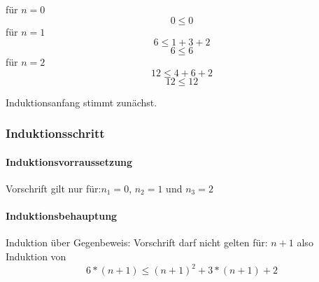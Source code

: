\documentclass{article}
\begin{document}
für $n=0$
\[0 \le 0\]
für $n=1$
\[6 \le 1+3+2\]
\[ 6 \le 6 \]
\newline
für $n=2$
\[12 \le 4+6+2\]
\[ 12 \le 12 \]
\newline

Induktionsanfang stimmt zunächst.
\subsubsection{Induktionsschritt}
\paragraph{Induktionsvorraussetzung}\mbox{}

Vorschrift gilt nur für:$n_1=0$,  $n_2=1$ und  $n_3=2$

\paragraph{Induktionsbehauptung}\mbox{}
Induktion über Gegenbeweis:
Vorschrift darf nicht gelten für: $n+1$ also Induktion von \[6*(n+1) \le (n+1)^2+3*(n+1)+2\]
\end{document}
